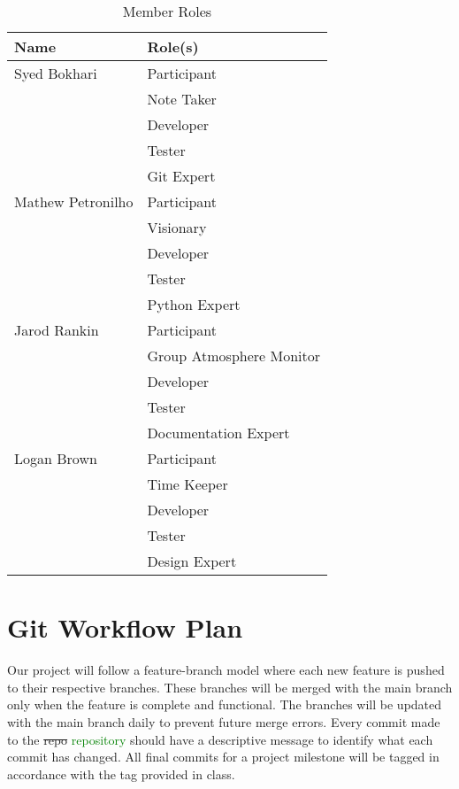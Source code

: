 \documentclass{article}
\begin{document}
\begin{table}[H]
    \centering
    \begin{tabularx}{\textwidth}{|X|X|}
\hline
        \textbf{Name} & \textbf{Role(s)}\\
\hline
        Syed Bokhari                    & Participant\\
                                    & Note Taker\\
                                    & Developer\\
                                    & Tester\\
			    & Git Expert\\
\hline
        Mathew Petronilho                  & Participant\\
                                    & Visionary\\
                                    & Developer\\
                                    & Tester\\
			    & Python Expert\\
\hline
        Jarod Rankin                     & Participant\\
                                    & Group Atmosphere Monitor\\
                                    & Developer\\
                                    & Tester\\
			    & Documentation Expert\\
\hline
       Logan Brown                   & Participant\\
                                    & Time Keeper\\
                                    & Developer\\
                                    & Tester\\
			    & Design Expert\\
\hline
    \end{tabularx}
\caption{Member Roles} \label{tab:memberRoles}

\end{table}


\section{Git Workflow Plan}
Our project will follow a feature-branch model where each new feature is pushed to their respective branches. These branches will be merged with the main branch only when the feature is complete and functional. The branches will be updated with the main branch daily to prevent future merge errors. Every commit made to the \sout{repo} \textcolor{Green}{repository} should have a descriptive message to identify what each commit has changed.
All final commits for a project milestone will be tagged in accordance with the tag provided in class.
\end{document}
